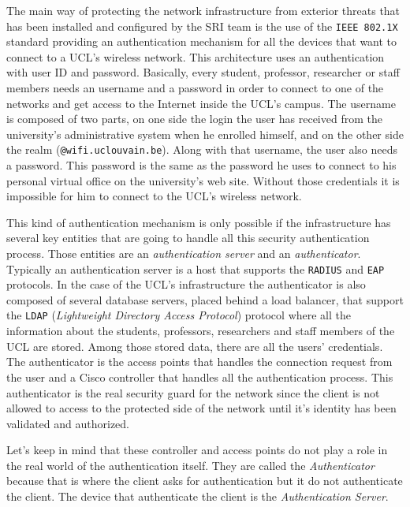 The main way of protecting the network infrastructure from exterior threats that has been installed and configured by the SRI team is the use of the \texttt{IEEE 802.1X} standard providing an authentication mechanism for all the devices that want to connect to a UCL's wireless network. This architecture uses an authentication with user ID and password. Basically, every student, professor, researcher or staff members needs an username and a password in order to connect to one of the networks and get access to the Internet inside the UCL's campus. The username is composed of two parts, on one side the login the user has received from the university's administrative system when he enrolled himself, and on the other side the realm (\texttt{@wifi.uclouvain.be}). Along with that username, the user also needs a password. This password is the same as the password he uses to connect to his personal virtual office on the university's web site. Without those credentials it is impossible for him to connect to the UCL's wireless network.

This kind of authentication mechanism is only possible if the infrastructure has several key entities that are going to handle all this security authentication process. Those entities are an \textit{authentication server} and an \textit{authenticator}. Typically an authentication server is a host that supports the \texttt{RADIUS} and  \texttt{EAP} protocols. In the case of the UCL's infrastructure the authenticator is also composed of several database servers, placed behind a load balancer, that support the \texttt{LDAP} (\textit{Lightweight Directory Access Protocol}) protocol where all the information about the students, professors, researchers and staff members of the UCL are stored. Among those stored data, there are all the users' credentials. The authenticator is the access points that handles the connection request from the user and a Cisco controller that handles all the authentication process. This authenticator is the real security guard for the network since the client is not allowed to access to the protected side of the network until it's identity has been validated and authorized.

Let's keep in mind that these controller and access points do not play a role in the real world of the authentication itself. They are called the \textit{Authenticator} because that is where the client asks for authentication but it do not authenticate the client. The device that authenticate the client is the \textit{Authentication Server}.


